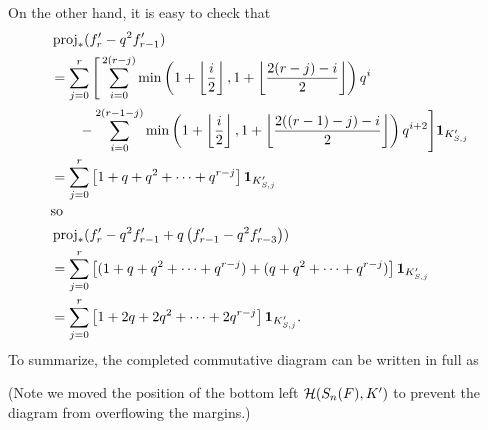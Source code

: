 On the other hand, it is easy to check that
\begin{align*}
  &\operatorname{proj}_\ast(f'_r -q^2 f'_{r-1}) \\
  &= \sum_{j=0}^r \Bigg[
      \sum_{i=0}^{2(r-j)} \min \left( 1 + \left\lfloor \frac i2 \right\rfloor,
      1 + \left\lfloor \frac{2(r-j)-i}{2} \right\rfloor \right) q^i \\
  &\qquad - \sum_{i=0}^{2(r-1-j)} \min \left( 1 + \left\lfloor \frac i2 \right\rfloor,
    1 + \left\lfloor \frac{2((r-1)-j)-i}{2} \right\rfloor \right) q^{i+2}
  \Bigg] \mathbf{1}_{K'_{S,j}} \\
  &= \sum_{j=0}^r \left[ 1+q+q^2+\dots+q^{r-j} \right] \mathbf{1}_{K'_{S,j}} \\
  \intertext{so}
  &\operatorname{proj}_\ast(f'_r -q^2 f'_{r-1} + q \left( f'_{r-1} - q^2 f'_{r-3} \right)) \\
  &= \sum_{j=0}^r \left[ (1+q+q^2+\dots+q^{r-j})+(q+q^2+\dots+q^{r-j}) \right] \mathbf{1}_{K'_{S,j}} \\
  &= \sum_{j=0}^r \left[ 1 + 2q + 2q^2 + \dots + 2q^{r-j} \right] \mathbf{1}_{K'_{S,j}}.
\end{align*}
To summarize, the completed commutative diagram can be written in full as
\begin{center}
\end{center}
(Note we moved the position of the bottom left $\mathcal H(S_n(F), K')$
to prevent the diagram from overflowing the margins.)

